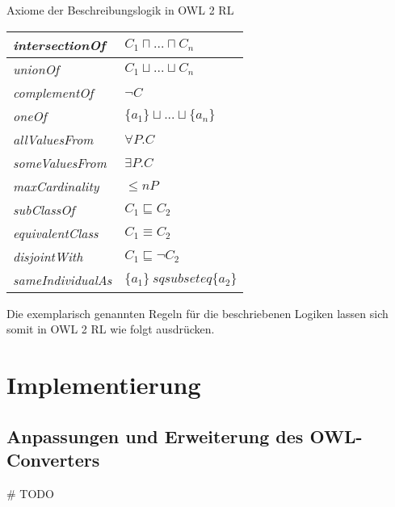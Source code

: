 \documentclass[runningheads,a4paper]{llncs}
\begin{document}
Axiome der Beschreibungslogik in OWL 2 RL
\begin{table}[h]
\begin{tabular}{|l|l|}
\hline
\textit{intersectionOf} & $ C_1 \sqcap ... \sqcap C_n$\\ \hline
\textit{unionOf} & $C_1 \sqcup ... \sqcup C_n$\\ \hline
\textit{complementOf} & $\neg C$\\ \hline
\textit{oneOf} & $ \{a_1\} \sqcup ... \sqcup \{a_n\}$\\ \hline
\textit{allValuesFrom} & $\forall P.C$\\ \hline
\textit{someValuesFrom} & $\exists P.C$\\ \hline
\textit{maxCardinality} & $ \leq n P$\\ \hline
\textit{subClassOf} & $ C_1 \sqsubseteq C_2 $\\ \hline
\textit{equivalentClass} & $ C_1 \equiv C_2 $\\ \hline
\textit{disjointWith} & $C_1 \sqsubseteq \neg C_2$\\ \hline
\textit{sameIndividualAs} & $ \{a_1\} \ sqsubseteq \{a_2\} $\\ \hline
\end{tabular}
\end{table}

Die exemplarisch genannten Regeln für die beschriebenen Logiken lassen sich somit in OWL 2 RL wie folgt ausdrücken.









\section{Implementierung}

\subsection{Anpassungen und Erweiterung des OWL-Converters}
\# TODO
\end{document}
